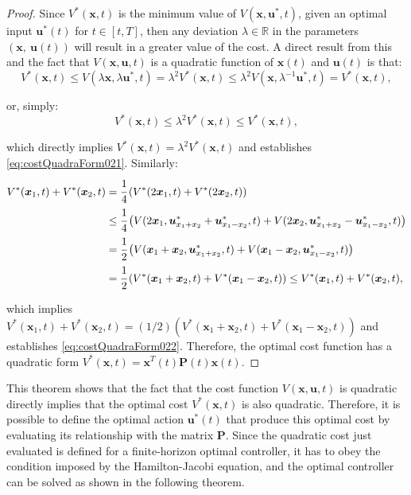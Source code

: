 \documentclass[a4paper,11pt]{book}
\numberwithin{figure}{chapter}
\numberwithin{equation}{chapter}
\numberwithin{table}{chapter}
\theoremstyle{definition}
\begin{document}
\begin{proof}
    Since $V^*(\bm{x}, t)$ is the minimum value of $V(\bm{x}, \bm{u}^*, t)$, given an optimal input $\bm{u}^*(t)$ for $t \in [t, T]$, then any deviation $\lambda \in \mathbb{R}$ in the parameters $(\bm{x},\ \bm{u}(t))$ will result in a greater value of the cost. A direct result from this and the fact that $V(\bm{x}, \bm{u}, t)$ is a quadratic function of $\bm{x}(t)$ and $\bm{u}(t)$ is that:
    \begin{equation}
        V^*(\bm{x}, t) \leq V(\lambda \bm{x}, \lambda \bm{u}^*, t) = \lambda^2 V^*(\bm{x}, t) \leq \lambda^2 V(\bm{x}, \lambda^{-1} \bm{u}^*, t) = V^*(\bm{x}, t)
    ,\end{equation}
    
    \noindent or, simply:
    \begin{equation}
        V^*(\bm{x}, t) \leq \lambda^2 V^*(\bm{x}, t) \leq V^*(\bm{x}, t)
    ,\end{equation}
    
    \noindent which directly implies $V^*(\bm{x}, t) = \lambda^2 V^*(\bm{x}, t)$ and establishes \eqref{eq:costQuadraForm021}. Similarly:
    \begin{align}
    \begin{split}
        V^*(\bm{x}_1, t) + V^*(\bm{x}_2, t) &= \cfrac{1}{4} \left( V^*(2 \bm{x}_1, t) + V^*(2 \bm{x}_2, t) \right) \\
            & \leq \cfrac{1}{4} \left( V(2 \bm{x}_1, \bm{u}_{x_1+x_2}^* + \bm{u}_{x_1-x_2}^*, t) + V(2 \bm{x}_2, \bm{u}_{x_1+x_2}^* - \bm{u}_{x_1-x_2}^*, t) \right) \\
            & = \cfrac{1}{2} \left( V(\bm{x}_1 + \bm{x}_2, \bm{u}_{x_1+x_2}^*, t) + V(\bm{x}_1 - \bm{x}_2, \bm{u}_{x_1-x_2}^*, t) \right) \\
            & = \cfrac{1}{2} \left( V^*(\bm{x}_1 + \bm{x}_2, t) + V^*(\bm{x}_1 - \bm{x}_2, t) \right) \leq V^*(\bm{x}_1, t) + V^*(\bm{x}_2, t),
    \end{split}
    \end{align}
    
    \noindent which implies $V^*(\bm{x}_1, t) + V^*(\bm{x}_2, t) = (1/2) \left( V^*(\bm{x}_1 + \bm{x}_2, t) + V^*(\bm{x}_1 - \bm{x}_2, t) \right)$ and establishes \eqref{eq:costQuadraForm022}. Therefore, the optimal cost function has a quadratic form $V^*(\bm{x}, t) = \bm{x}^T(t) \bm{P}(t) \bm{x}(t)$.
\end{proof}

This theorem shows that the fact that the cost function $V(\bm{x}, \bm{u}, t)$ is quadratic directly implies that the optimal cost $V^*(\bm{x}, t)$ is also quadratic. Therefore, it is possible to define the optimal action $\bm{u}^*(t)$ that produce this optimal cost by evaluating its relationship with the matrix $\bm{P}$. Since the quadratic cost just evaluated is defined for a finite-horizon optimal controller, it has to obey the condition imposed by the Hamilton-Jacobi equation, and the optimal controller can be solved as shown in the following theorem.
\end{document}
